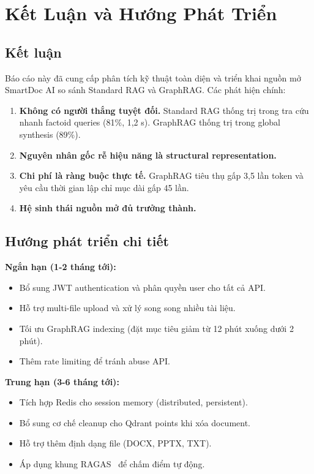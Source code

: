 \documentclass[10pt, conference, a4paper]{IEEEtran}
\begin{document}
\section{Kết Luận và Hướng Phát Triển}

\subsection{Kết luận}

Báo cáo này đã cung cấp phân tích kỹ thuật toàn diện và triển khai
nguồn mở SmartDoc AI so sánh Standard RAG và GraphRAG. Các phát hiện chính:
\begin{enumerate}
  \item \textbf{Không có người thắng tuyệt đối.} Standard RAG thống
    trị trong tra cứu nhanh factoid queries (81\%, 1,2 s). GraphRAG
    thống trị trong global synthesis (89\%).
  \item \textbf{Nguyên nhân gốc rễ hiệu năng là structural representation.}
  \item \textbf{Chi phí là ràng buộc thực tế.} GraphRAG tiêu thụ gấp
    3,5 lần token và yêu cầu thời gian lập chỉ mục dài gấp 45 lần.
  \item \textbf{Hệ sinh thái nguồn mở đủ trưởng thành.}
\end{enumerate}

\subsection{Hướng phát triển chi tiết}

\textbf{Ngắn hạn (1-2 tháng tới):}
\begin{itemize}
  \item Bổ sung JWT authentication và phân quyền user cho tất cả API.
  \item Hỗ trợ multi-file upload và xử lý song song nhiều tài liệu.
  \item Tối ưu GraphRAG indexing (đặt mục tiêu giảm từ 12 phút xuống dưới 2 phút).
  \item Thêm rate limiting để tránh abuse API.
\end{itemize}

\textbf{Trung hạn (3-6 tháng tới):}
\begin{itemize}
  \item Tích hợp Redis cho session memory (distributed, persistent).
  \item Bổ sung cơ chế cleanup cho Qdrant points khi xóa document.
  \item Hỗ trợ thêm định dạng file (DOCX, PPTX, TXT).
  \item Áp dụng khung RAGAS~\cite{es2023ragas} để chấm điểm tự động.
\end{itemize}
\end{document}
